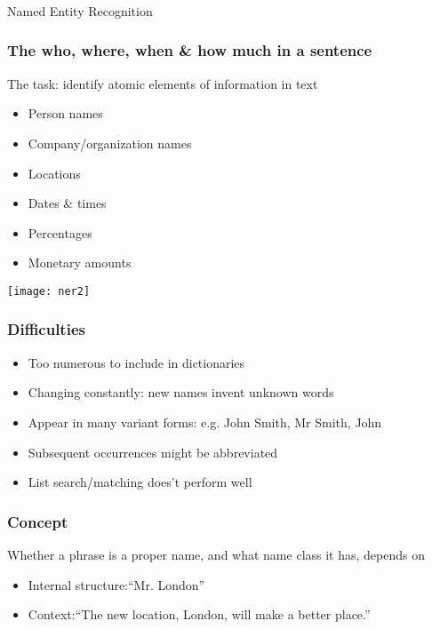 \begin{frame}[fragile]\frametitle{}

\begin{center}
{\Large Named Entity Recognition}
\end{center}
\end{frame}


\begin{frame}[fragile]\frametitle{The who, where, when \& how much in a sentence}
The task: identify atomic elements of information in text
  \begin{itemize}
  \item Person names
  \item Company/organization names
  \item Locations
  \item Dates \& times
  \item Percentages
  \item Monetary amounts
  \end{itemize}
  \begin{center}
\texttt{[image: ner2]}
\end{center}
\end{frame}



\begin{frame}[fragile]\frametitle{Difficulties}
  \begin{itemize}
  \item Too numerous to include in dictionaries
  \item Changing constantly: new names invent unknown words
  \item Appear in many variant forms: e.g. John Smith, Mr Smith, John
  \item Subsequent occurrences might be abbreviated
  \item List search/matching does't perform well
  \end{itemize}
\end{frame}

\begin{frame}[fragile]\frametitle{Concept}
Whether a phrase is a proper name, and what name class it has, depends on

  \begin{itemize}
  \item Internal structure:``Mr. London'' 
  \item Context:``The new location, London, will make a better place.''
  \end{itemize}
\end{frame}

